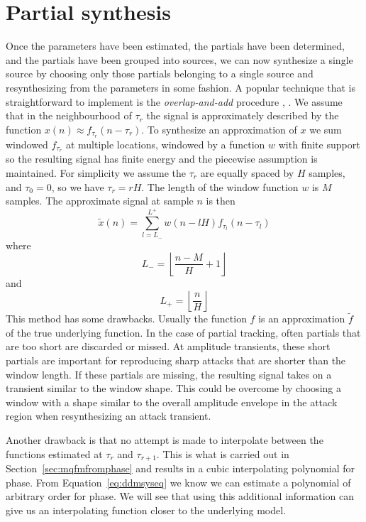 \section{Partial synthesis \label{sec:partialsynthesis}}

Once the parameters have been estimated, the partials have been determined, and
the partials have been grouped into sources, we can now synthesize a single
source by choosing only those partials belonging to a single source and
resynthesizing from the parameters in some fashion. A popular technique that is
straightforward to implement is the \textit{overlap-and-add} procedure
\cite{portnoff1976implementation}, \cite{moore1990elements}. We assume that in
the neighbourhood of $\tau_{r}$ the signal is approximately described by the
function $x(n) \approx f_{\tau_{r}}(n-\tau_{r})$. To synthesize an approximation of $x$
we sum windowed $f_{\tau_{r}}$ at multiple locations, windowed by a function $w$
with finite support so
the resulting signal has finite energy and the piecewise assumption is
maintained. For simplicity we assume the $\tau_{r}$ are equally spaced by $H$
samples, and $\tau_{0}=0$, so we have $\tau_{r} = rH$. The length of the window
function $w$ is $M$ samples. The approximate signal at sample $n$ is then
\[
    \tilde{x}(n) = \sum_{l=L_{-}}^{L^{+}} w(n-lH) f_{\tau_l}(n-\tau_l)
\]
where
\[
    L_{-} = \left\lfloor \frac{n-M}{H} + 1 \right\rfloor
\]
and
\[
    L_{+} = \left\lfloor \frac{n}{H} \right\rfloor
\]
This method has some drawbacks. Usually the function $f$ is an approximation
$\tilde{f}$ of the true underlying function. In the case of partial tracking,
often partials that are too short are discarded or missed. At amplitude
transients, these short partials are important for reproducing sharp attacks
that are shorter than the window length. If these partials are missing, the
resulting signal takes on a transient similar to the window shape. This could be
overcome by choosing a window with a shape similar to the overall amplitude
envelope in the attack region when resynthesizing an attack transient.

Another drawback is that no attempt is made to interpolate between the functions
estimated at $\tau_{r}$ and $\tau_{r+1}$. This is what is carried out in
Section~\ref{sec:mqfmfromphase} and results in a cubic interpolating polynomial
for phase. From Equation~\ref{eq:ddmsyseq} we know we can estimate a polynomial
of arbitrary order for phase. We will see that using this additional information
can give us an interpolating function closer to the underlying model.
